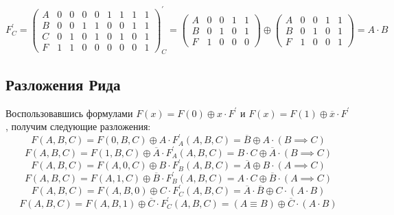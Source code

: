 \documentclass[a4paper,10pt]{article} %
\begin{document}
	\begin{equation}
		F^{\prime}_{C} = 
		\left(
		\begin{smallmatrix}
			A & 0 & 0 & 0 & 0 & 1 & 1 & 1 & 1 \\
			B & 0 & 0 & 1 & 1 & 0 & 0 & 1 & 1 \\
			C & 0 & 1 & 0 & 1 & 0 & 1 & 0 & 1 \\
			F & 1 & 1 & 0 & 0 & 0 & 0 & 0 & 1
		\end{smallmatrix}
		\right)^{\prime}_{C} =
		\left(
		\begin{smallmatrix}
			A & 0 & 0 & 1 & 1 \\
			B & 0 & 1 & 0 & 1 \\
			F & 1 & 0 & 0 & 0
		\end{smallmatrix}
		\right) \oplus
		\left(
		\begin{smallmatrix}
			A & 0 & 0 & 1 & 1 \\
			B & 0 & 1 & 0 & 1 \\
			F & 1 & 0 & 0 & 1 
		\end{smallmatrix}
		\right)
		= A \cdot B
	\end{equation}

	
	\subsection{Разложения Рида}
	Воспользовавшись формулами $F(x) = F(0) \oplus x \cdot F^{\prime}$ 
	и $F(x) = F(1) \oplus \overline{x} \cdot F^{\prime}$, получим следующие
	разложения:
	\begin{equation}
		F(A, B, C) = F(0, B, C) \oplus A \cdot F_{A}^{\prime}(A, B, C) =
		\overline{B} \oplus A \cdot (B \implies C) 
	\end{equation}
	\begin{equation}
		F(A, B, C) = F(1, B, C) \oplus \overline{A} \cdot F_{A}^{\prime}(A, B, C) =
		B \cdot C \oplus \overline{A} \cdot (B \implies C)
	\end{equation}
	\begin{equation}
		F(A, B, C) = F(A, 0, C) \oplus B \cdot F_{B}^{\prime}(A, B, C) =
		\overline{A} \oplus B \cdot (A \implies C)
	\end{equation}
	\begin{equation}
		F(A, B, C) = F(A, 1, C) \oplus \overline{B} \cdot F_{B}^{\prime}(A, B, C) =
		A \cdot C \oplus \overline{B} \cdot (A \implies C)
	\end{equation}
	\begin{equation}
		F(A, B, C) = F(A, B, 0) \oplus C \cdot F_{C}^{\prime}(A, B, C) =
		\overline{A} \cdot \overline{B} \oplus C \cdot (A \cdot B)
	\end{equation}
	\begin{equation}
		F(A, B, C) = F(A, B, 1) \oplus \overline{C} \cdot F_{C}^{\prime}(A, B, C) =
		(A \equiv B) \oplus \overline{C} \cdot (A \cdot B) 
	\end{equation}
\end{document}
